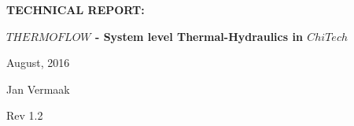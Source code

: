 \documentclass[11pt,letterpaper,titlepage]{article}
\begin{document}
\newcommand{\NSCDOCNUMBR}{NSC-REP-15-X}         %
\newcommand{\NSCDOCSUBJT}{TECHNICAL REPORT: }   %
\newcommand{\NSCDOCTITLE}{$THERMOFLOW$ - System level Thermal-Hydraulics in $ChiTech$}       %
\newcommand{\NSCDOCDATE} {August, 2016}    %
\newcommand{\NSCDOCREV}  {Rev 1.2} %



\begin{titlepage}
	\pagestyle{fancy}
	\vspace*{1.0cm}
	\centering
	\vspace{1cm}
	\vspace{.25cm}
	{\Large\bfseries  \NSCDOCSUBJT \par} 
	{\Large\bfseries \NSCDOCTITLE  \par}
	\vspace{1cm}
	{\Large \NSCDOCDATE \par}
	\vspace{1.0cm}
	{\Large Jan Vermaak \par}
	{\Large \NSCDOCREV \par}
		

	\begin{center}
		\begin{minipage}[c]{0.45\textwidth}
			\begin{figure}[H]
			

\end{figure}
\end{minipage}
\end{center}
\end{titlepage}
\end{document}
